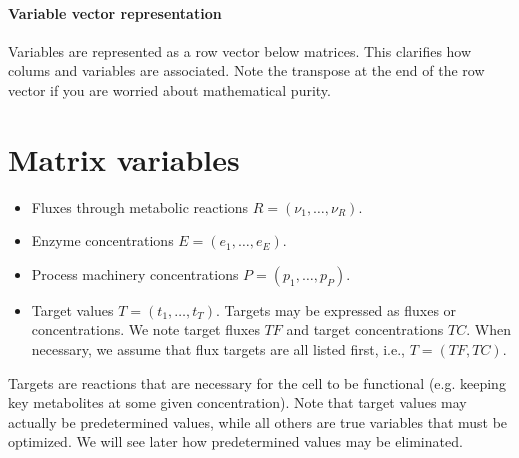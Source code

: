 \documentclass[12pt]{scrartcl}
\theoremstyle{definition}
\theoremstyle{remark}
\numberwithin{equation}{section}
\begin{document}
\paragraph{Variable vector representation}
Variables are represented as a row vector below matrices.
This clarifies how colums and variables are associated.
Note the transpose at the end of the row vector if you are worried about
mathematical purity.

\section{Matrix variables}

\begin{itemize}
  \item Fluxes through metabolic reactions $R = (\nu_1, \ldots ,\nu_R)$.
  \item Enzyme concentrations $E = (e_1, \ldots, e_E)$.
  \item Process machinery concentrations $P = (p_1, \ldots, p_P)$.
  \item Target values $T = (t_1, \ldots, t_T)$.
  Targets may be expressed as fluxes or concentrations.
  We note target fluxes $TF$ and target concentrations $TC$.
  When necessary, we assume that flux targets are all listed first,
  i.e., $T = (TF, TC)$.

\end{itemize}
Targets are reactions that are necessary for the cell to be functional
(e.g. keeping key metabolites at some given concentration).
Note that target values may actually be predetermined values,
while all others are true variables that must be optimized.
We will see later how predetermined values may be eliminated.


\clearpage


\clearpage

\newpage
\appendix

\clearpage



%
%
\end{document}
